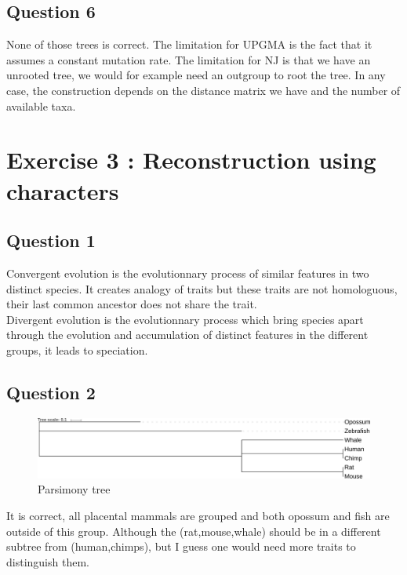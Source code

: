 \documentclass[]{article}
\theoremstyle{definition}
\begin{document}
\subsection{Question 6}
None of those trees is correct. The limitation for UPGMA is the fact that it assumes a constant mutation rate. The limitation for NJ is that we have an unrooted tree, we would for example need an outgroup to root the tree. In any case, the construction depends on the distance matrix we have and the number of available taxa.

\section{Exercise 3 : Reconstruction using characters}
\subsection{Question 1}
Convergent evolution is the evolutionnary process of similar features in two distinct species. It creates analogy of traits but these traits are not homologuous, their last common ancestor does not share the trait.\\
Divergent evolution is the evolutionnary process which bring species apart through the evolution and accumulation of distinct features in the different groups, it leads to speciation.
\subsection{Question 2}
\begin{figure}[h!]
	\includegraphics*[width = \linewidth]{../ex3/PARS.pdf}
	\caption{\label{nj2} Parsimony tree }
\end{figure}
It is correct, all placental mammals are grouped and both opossum and fish are outside of this group. Although the (rat,mouse,whale) should be in a different subtree from (human,chimps), but I guess one would need more traits to distinguish them. 
\end{document}
